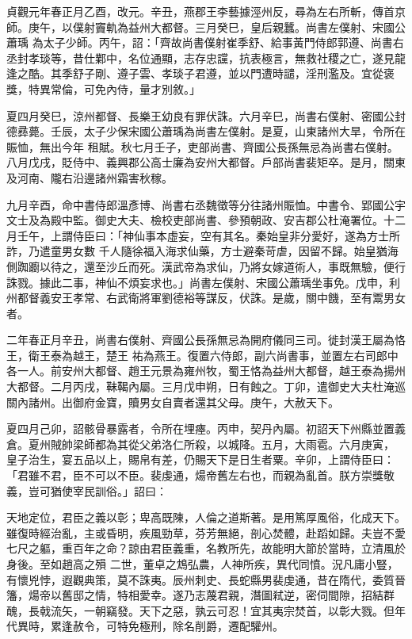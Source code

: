 \begin{pinyinscope}
 貞觀元年春正月乙酉，改元。辛丑，燕郡王李藝據涇州反，尋為左右所斬，傳首京師。庚午，以僕射竇軌為益州大都督。三月癸巳，皇后親蠶。尚書左僕射、宋國公蕭瑀
 為太子少師。丙午，詔：「齊故尚書僕射崔季舒、給事黃門侍郎郭遵、尚書右丞封孝琰等，昔仕鄴中，名位通顯，志存忠讜，抗表極言，無救社稷之亡，遂見龍逢之酷。其季舒子剛、遵子雲、孝琰子君遵，並以門遭時譴，淫刑濫及。宜從褒獎，特異常倫，可免內侍，量才別敘。」



 夏四月癸巳，涼州都督、長樂王幼良有罪伏誅。六月辛巳，尚書右僕射、密國公封德彞薨。壬辰，太子少保宋國公蕭瑀為尚書左僕射。是夏，山東諸州大旱，令所在賑恤，無出今年
 租賦。秋七月壬子，吏部尚書、齊國公長孫無忌為尚書右僕射。八月戊戌，貶侍中、義興郡公高士廉為安州大都督。戶部尚書裴矩卒。是月，關東及河南、隴右沿邊諸州霜害秋稼。



 九月辛酉，命中書侍郎溫彥博、尚書右丞魏徵等分往諸州賑恤。中書令、郢國公宇文士及為殿中監。御史大夫、檢校吏部尚書、參預朝政、安吉郡公杜淹署位。十二月壬午，上謂侍臣曰：「神仙事本虛妄，空有其名。秦始皇非分愛好，遂為方士所詐，乃遣童男女數
 千人隨徐福入海求仙藥，方士避秦苛虐，因留不歸。始皇猶海側踟躕以待之，還至沙丘而死。漢武帝為求仙，乃將女嫁道術人，事既無驗，便行誅戮。據此二事，神仙不煩妄求也。」尚書左僕射、宋國公蕭瑀坐事免。戊申，利州都督義安王孝常、右武衛將軍劉德裕等謀反，伏誅。是歲，關中饑，至有鬻男女者。



 二年春正月辛丑，尚書右僕射、齊國公長孫無忌為開府儀同三司。徙封漢王屬為恪王，衛王泰為越王，楚王
 祐為燕王。復置六侍郎，副六尚書事，並置左右司郎中各一人。前安州大都督、趙王元景為雍州牧，蜀王恪為益州大都督，越王泰為揚州大都督。二月丙戌，靺鞨內屬。三月戊申朔，日有蝕之。丁卯，遣御史大夫杜淹巡關內諸州。出御府金寶，贖男女自賣者還其父母。庚午，大赦天下。



 夏四月己卯，詔骸骨暴露者，令所在埋瘞。丙申，契丹內屬。初詔天下州縣並置義倉。夏州賊帥梁師都為其從父弟洛仁所殺，以城降。五月，大雨雹。六月庚寅，
 皇子治生，宴五品以上，賜帛有差，仍賜天下是日生者粟。辛卯，上謂侍臣曰：「君雖不君，臣不可以不臣。裴虔通，煬帝舊左右也，而親為亂首。朕方崇獎敬義，豈可猶使宰民訓俗。」詔曰：



 天地定位，君臣之義以彰；卑高既陳，人倫之道斯著。是用篤厚風俗，化成天下。雖復時經治亂，主或昏明，疾風勁草，芬芳無絕，剖心焚體，赴蹈如歸。夫豈不愛七尺之軀，重百年之命？諒由君臣義重，名教所先，故能明大節於當時，立清風於身後。至如趙高之殞
 二世，董卓之鴆弘農，人神所疾，異代同憤。況凡庸小豎，有懷兇悖，遐觀典策，莫不誅夷。辰州刺史、長蛇縣男裴虔通，昔在隋代，委質晉籓，煬帝以舊邸之情，特相愛幸。遂乃志蔑君親，潛圖弒逆，密伺間隙，招結群醜，長戟流矢，一朝竊發。天下之惡，孰云可忍！宜其夷宗焚首，以彰大戮。但年代異時，累逢赦令，可特免極刑，除名削爵，遷配驩州。




\end{pinyinscope}
